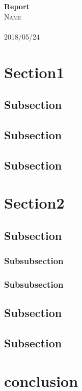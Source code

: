 \documentclass[12pt, onside]{article}
\begin{document}
\begin{titlepage}
\begin{center}
\end{center}
\vspace{2cm}
    \begin{center}
    \huge{\bfseries Report}\\
    [3cm] %
    \textsc{\LARGE Name}\\
    \textsc{\Large}\\ 
    [2cm]
    2018/05/24
    \end{center}
\vfill

\end{titlepage}
\newpage
\listoffigures
{}

\listoftables
{}

\tableofcontents

\newpage
\section{Section1}


\subsection{Subsection}
\subsection{Subsection}
\subsection{Subsection}

\section{Section2}


\subsection{Subsection}
\subsubsection{Subsubsection}
\subsubsection{Subsubsection}
\subsection{Subsection}
\subsection{Subsection}

\section{conclusion}



\newpage


\clearpage


\end{document}
